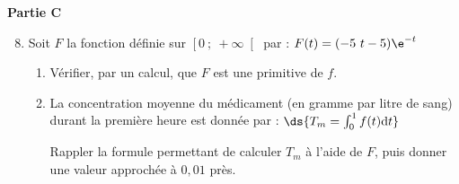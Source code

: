 {\bf Partie C}

\begin{enumerate}
	\setcounter{enumi}{7}
	\item Soit $F$ la fonction définie sur $\left[0~;~+\infty\right[$ par : $F(t)=(-5~t-5)\e^{-t}$
	\begin{enumerate}
		\item Vérifier, par un calcul, que $F$ est une primitive de $f$. \par \vspace*{0.5cm}

		
		\item La concentration moyenne du médicament (en gramme par litre de sang) durant la première heure est donnée par : $\ds{T_m = \int_0^1f(t)\text{d}t}$
		
		Rappler la formule permettant de calculer $T_m$ à l'aide de $F$, puis donner une valeur approchée à $0,01$ près.\par \vspace*{0.5cm}

	\end{enumerate}
\end{enumerate}